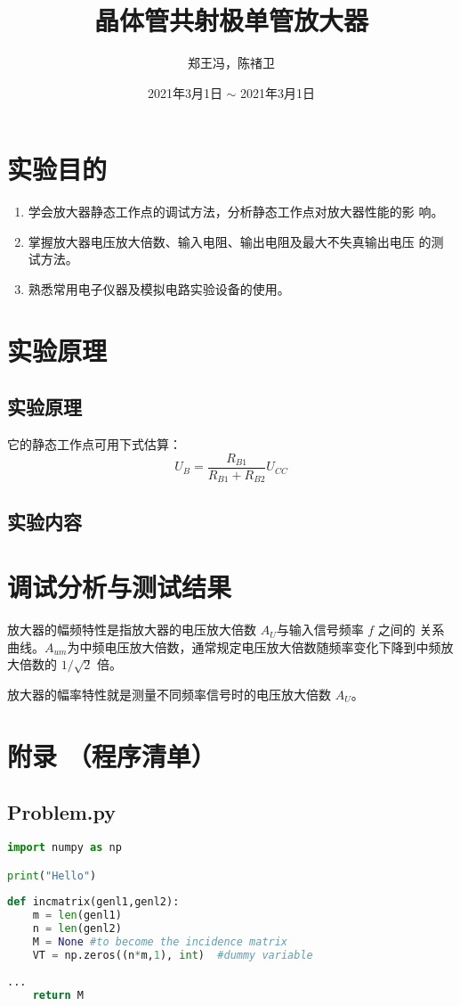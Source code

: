 \documentclass{ExpReport}
\author{郑王冯，陈禇卫} %
\title{晶体管共射极单管放大器} %
\date{2021年3月1日 $\sim$ 2021年3月1日} %
\begin{document}
    \maketitle
    
    \section{实验目的}

    \begin{enumerate}
        \item 学会放大器静态工作点的调试方法，分析静态工作点对放大器性能的影
        响。
        \item 掌握放大器电压放大倍数、输入电阻、输出电阻及最大不失真输出电压
        的测试方法。
        \item 熟悉常用电子仪器及模拟电路实验设备的使用。
    \end{enumerate}

    \section{实验原理}

    \subsection{实验原理}
    它的静态工作点可用下式估算：
    $$
    U_B = \frac{R_{B1}}{R_{B1}+R_{B2}}U_{CC}
    $$

    \subsection{实验内容}

    \section{调试分析与测试结果}

    放大器的幅频特性是指放大器的电压放大倍数 $A_U$与输入信号频率 $f$ 之间的
关系曲线。$A_{um}$为中频电压放大倍数，通常规定电压放大倍数随频率变化下降到中频放大倍数的 $1/\sqrt{2}$ 倍。

    放大器的幅率特性就是测量不同频率信号时的电压放大倍数 $A_U$。
\newpage
\appendix
\section*{附录 （程序清单） }
\subsection{Problem.py}
\begin{lstlisting}[language=Python]
import numpy as np

print("Hello")
    
def incmatrix(genl1,genl2):
    m = len(genl1)
    n = len(genl2)
    M = None #to become the incidence matrix
    VT = np.zeros((n*m,1), int)  #dummy variable
    
...
    return M
\end{lstlisting}
\end{document}
